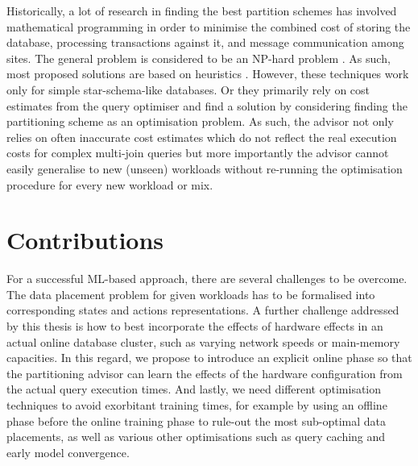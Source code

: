 Historically, a lot of research in finding the best partition schemes has involved mathematical programming in order to minimise the combined cost of storing the database, processing transactions against it, and message communication among sites. The general problem is considered to be an NP-hard problem \cite{ozsu2011principles}. As such, most proposed solutions are based on heuristics \cite{navathe1984vertical, agrawal2004integrating, agrawal2006automatic, bruno2007online, bruno2008constrained, kimura2010coradd, ozmen2010workload, curino2010schism, quamar2013sword, DBLP:conf/sigmod/ZhouBL12, DBLP:conf/sigmod/NehmeB11}. However, these techniques work only for simple star-schema-like databases. Or they primarily rely on cost estimates from the query optimiser and find a solution by considering finding the partitioning scheme as an optimisation problem. As such, the advisor not only relies on often inaccurate cost estimates which do not reflect the real execution costs for complex multi-join queries but more importantly the advisor cannot easily generalise to new (unseen) workloads without re-running the optimisation procedure for every new workload or mix. 
\section{Contributions}
\label{contribs}

For a successful ML-based approach, there are several challenges to be overcome. The data placement problem for given workloads has to be formalised into corresponding states and actions representations. A further challenge addressed by this thesis is how to best incorporate the effects of hardware effects in an actual online database cluster, such as varying network speeds or main-memory capacities. In this regard, we propose to introduce an explicit online phase so that the partitioning advisor can learn the effects of the hardware configuration from the actual query execution times.  
And lastly, we need different optimisation techniques to avoid exorbitant training times, for example by using an offline phase before the online training phase to rule-out the most sub-optimal data placements, as well as various other optimisations such as query caching and early model convergence. 
 

